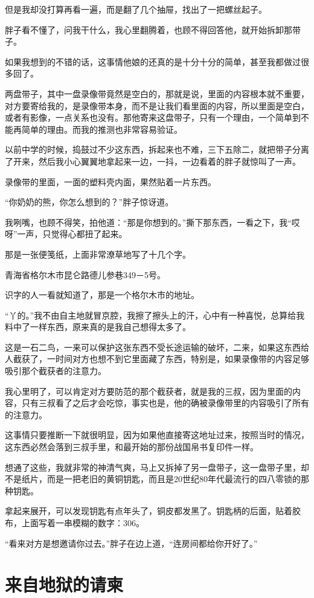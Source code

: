 但是我却没打算再看一遍，而是翻了几个抽屉，找出了一把螺丝起子。

胖子看不懂了，问我干什么，我心里翻腾着，也顾不得回答他，就开始拆卸那带子。

如果我想到的不错的话，这事情他娘的还真的是十分十分的简单，甚至我都做过很多回了。

两盘带子，其中一盘录像带竟然是空白的，那就是说，里面的内容根本就不重要，对方要寄给我的，是录像带本身，而不是让我们看里面的内容，所以里面是空白，或者有影像，一点关系也没有。那他寄来这盘带子，只有一个理由，一个简单到不能再简单的理由。而我的推测也非常容易验证。

以前中学的时候，捣鼓过不少这东西，拆起来也不难，三下五除二，就把带子分离了开来，然后我小心翼翼地拿起来一边，一抖，一边看着的胖子就惊叫了一声。

录像带的里面，一面的塑料壳内面，果然贴着一片东西。

“你奶奶的熊，你怎么想到的？”胖子惊讶道。

我咧嘴，也顾不得笑，拍他道：“那是你想到的。”撕下那东西，一看之下，我“哎呀”一声，只觉得心都扭了起来。

那是一张便笺纸，上面非常潦草地写了十几个字。

青海省格尔木市昆仑路德儿参巷349－5号。

识字的人一看就知道了，那是一个格尔木市的地址。

“丫的。”我不由自主地就冒京腔，我擦了擦头上的汗，心中有一种喜悦，总算给我料中了一样东西，原来真的是我自己想得太多了。

这是一石二鸟，一来可以保护这张东西不受长途运输的破坏，二来，如果这东西给人截获了，一时间对方也想不到它里面藏了东西，特别是，如果录像带的内容足够吸引那个截获者的注意力。

我心里明了，可以肯定对方要防范的那个截获者，就是我的三叔，因为里面的内容，只有三叔看了之后才会吃惊，事实也是，他的确被录像带里的内容吸引了所有的注意力。

这事情只要推断一下就很明显，因为如果他直接寄这地址过来，按照当时的情况，这东西必然会落到三叔手里，和最开始的那份战国帛书复印件一样。

想通了这些，我就非常的神清气爽，马上又拆掉了另一盘带子，这一盘带子里，却不是纸片，而是一把老旧的黄铜钥匙，而且是20世纪80年代最流行的四八零锁的那种钥匙。

拿起来展开，可以发现钥匙有点年头了，铜皮都发黑了。钥匙柄的后面，贴着胶布，上面写着一串模糊的数字：306。

“看来对方是想邀请你过去。”胖子在边上道，“连房间都给你开好了。”

\chapter{来自地狱的请柬}

